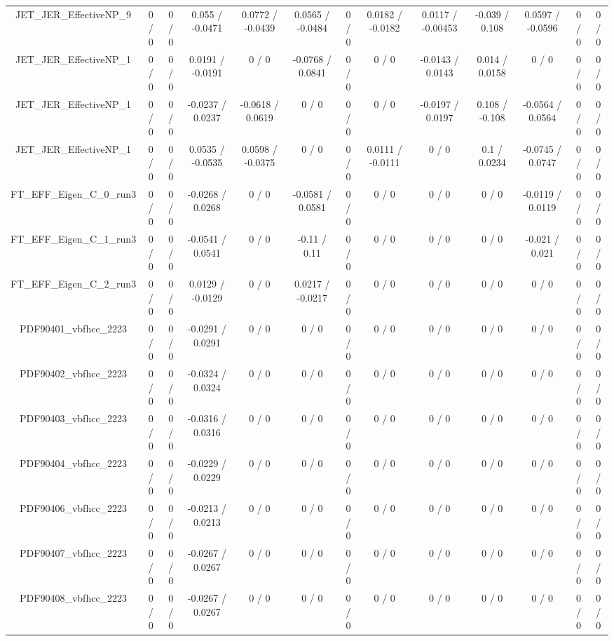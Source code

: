 \documentclass[10pt]{article}
\begin{document}
\begin{table}[htbp]
\begin{center}
\begin{tabular}{|c|c|c|c|c|c|c|c|c|c|c|c|c|}
  JET_JER_EffectiveNP_9 & 0 / 0 & 0 / 0 & 0.055 / -0.0471 & 0.0772 / -0.0439 & 0.0565 / -0.0484 & 0 / 0 & 0.0182 / -0.0182 & 0.0117 / -0.00453 & -0.039 / 0.108 & 0.0597 / -0.0596 & 0 / 0 & 0 / 0 \\ 
  JET_JER_EffectiveNP_1 & 0 / 0 & 0 / 0 & 0.0191 / -0.0191 & 0 / 0 & -0.0768 / 0.0841 & 0 / 0 & 0 / 0 & -0.0143 / 0.0143 & 0.014 / 0.0158 & 0 / 0 & 0 / 0 & 0 / 0 \\ 
  JET_JER_EffectiveNP_1 & 0 / 0 & 0 / 0 & -0.0237 / 0.0237 & -0.0618 / 0.0619 & 0 / 0 & 0 / 0 & 0 / 0 & -0.0197 / 0.0197 & 0.108 / -0.108 & -0.0564 / 0.0564 & 0 / 0 & 0 / 0 \\ 
  JET_JER_EffectiveNP_1 & 0 / 0 & 0 / 0 & 0.0535 / -0.0535 & 0.0598 / -0.0375 & 0 / 0 & 0 / 0 & 0.0111 / -0.0111 & 0 / 0 & 0.1 / 0.0234 & -0.0745 / 0.0747 & 0 / 0 & 0 / 0 \\ 
  FT_EFF_Eigen_C_0_run3 & 0 / 0 & 0 / 0 & -0.0268 / 0.0268 & 0 / 0 & -0.0581 / 0.0581 & 0 / 0 & 0 / 0 & 0 / 0 & 0 / 0 & -0.0119 / 0.0119 & 0 / 0 & 0 / 0 \\ 
  FT_EFF_Eigen_C_1_run3 & 0 / 0 & 0 / 0 & -0.0541 / 0.0541 & 0 / 0 & -0.11 / 0.11 & 0 / 0 & 0 / 0 & 0 / 0 & 0 / 0 & -0.021 / 0.021 & 0 / 0 & 0 / 0 \\ 
  FT_EFF_Eigen_C_2_run3 & 0 / 0 & 0 / 0 & 0.0129 / -0.0129 & 0 / 0 & 0.0217 / -0.0217 & 0 / 0 & 0 / 0 & 0 / 0 & 0 / 0 & 0 / 0 & 0 / 0 & 0 / 0 \\ 
  PDF90401_vbfhcc_2223 & 0 / 0 & 0 / 0 & -0.0291 / 0.0291 & 0 / 0 & 0 / 0 & 0 / 0 & 0 / 0 & 0 / 0 & 0 / 0 & 0 / 0 & 0 / 0 & 0 / 0 \\ 
  PDF90402_vbfhcc_2223 & 0 / 0 & 0 / 0 & -0.0324 / 0.0324 & 0 / 0 & 0 / 0 & 0 / 0 & 0 / 0 & 0 / 0 & 0 / 0 & 0 / 0 & 0 / 0 & 0 / 0 \\ 
  PDF90403_vbfhcc_2223 & 0 / 0 & 0 / 0 & -0.0316 / 0.0316 & 0 / 0 & 0 / 0 & 0 / 0 & 0 / 0 & 0 / 0 & 0 / 0 & 0 / 0 & 0 / 0 & 0 / 0 \\ 
  PDF90404_vbfhcc_2223 & 0 / 0 & 0 / 0 & -0.0229 / 0.0229 & 0 / 0 & 0 / 0 & 0 / 0 & 0 / 0 & 0 / 0 & 0 / 0 & 0 / 0 & 0 / 0 & 0 / 0 \\ 
  PDF90406_vbfhcc_2223 & 0 / 0 & 0 / 0 & -0.0213 / 0.0213 & 0 / 0 & 0 / 0 & 0 / 0 & 0 / 0 & 0 / 0 & 0 / 0 & 0 / 0 & 0 / 0 & 0 / 0 \\ 
  PDF90407_vbfhcc_2223 & 0 / 0 & 0 / 0 & -0.0267 / 0.0267 & 0 / 0 & 0 / 0 & 0 / 0 & 0 / 0 & 0 / 0 & 0 / 0 & 0 / 0 & 0 / 0 & 0 / 0 \\ 
  PDF90408_vbfhcc_2223 & 0 / 0 & 0 / 0 & -0.0267 / 0.0267 & 0 / 0 & 0 / 0 & 0 / 0 & 0 / 0 & 0 / 0 & 0 / 0 & 0 / 0 & 0 / 0 & 0 / 0 \\ 

\end{tabular}
\end{center}
\end{table}
\end{document}
